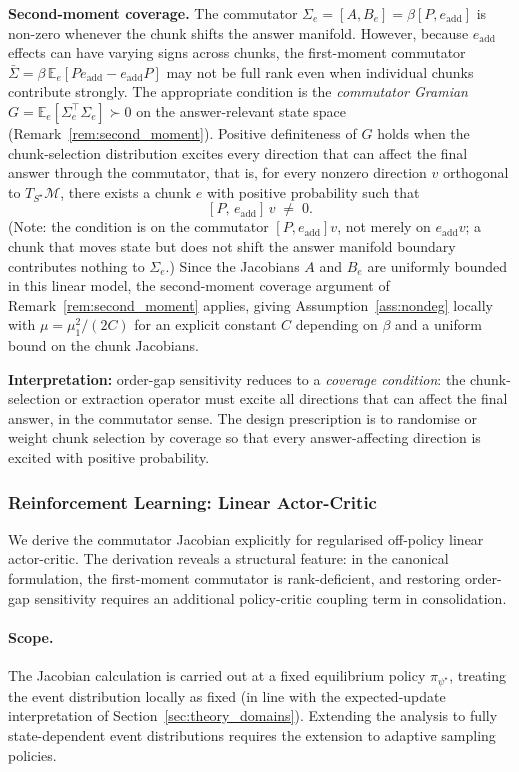 \documentclass[12pt,a4paper]{article}
\begin{document}
\textbf{Second-moment coverage.}
The commutator $\Sigma_e = [A, B_e] = \beta [P, e_{\textrm{add}}]$ is
non-zero whenever the chunk shifts the answer manifold. However, because
$e_{\textrm{add}}$ effects can have varying signs across chunks, the
first-moment commutator $\bar\Sigma = \beta\,\mathbb{E}_e[P
e_{\textrm{add}} - e_{\textrm{add}} P]$ may not be full rank even when
individual chunks contribute strongly. The appropriate condition is the
\emph{commutator Gramian} $G = \mathbb{E}_e[\Sigma_e^\top \Sigma_e] \succ 0$
on the answer-relevant state space (Remark~\ref{rem:second_moment}). Positive
definiteness of $G$ holds when the chunk-selection distribution excites every
direction that can affect the final answer through the commutator, that is,
for every nonzero direction $v$ orthogonal to $T_{S^\star}\mathcal{M}$,
there exists a chunk $e$ with positive probability such that
\[
  [P,\, e_{\textrm{add}}]\,v \;\neq\; 0.
\]
(Note: the condition is on the commutator $[P, e_{\textrm{add}}]v$, not merely
on $e_{\textrm{add}}v$; a chunk that moves state but does not shift the answer
manifold boundary contributes nothing to $\Sigma_e$.) Since the Jacobians
$A$ and $B_e$ are uniformly bounded in this linear model, the second-moment
coverage argument of Remark~\ref{rem:second_moment} applies, giving
Assumption~\ref{ass:nondeg} locally with $\mu = \mu_1^2/(2C)$ for an
explicit constant $C$ depending on $\beta$ and a uniform bound on the chunk Jacobians.

\textbf{Interpretation:} order-gap sensitivity reduces to a
\emph{coverage condition}: the chunk-selection or extraction
operator must excite all directions that can affect the final answer, in the
commutator sense.
The design prescription is to randomise or weight chunk selection by coverage
so that every answer-affecting direction is excited with positive probability.

\subsubsection*{Reinforcement Learning: Linear Actor-Critic}

We derive the commutator Jacobian explicitly for regularised off-policy linear
actor-critic. The derivation reveals a structural feature: in the canonical
formulation, the first-moment commutator is rank-deficient, and restoring
order-gap sensitivity requires an additional policy-critic coupling term in
consolidation.

\paragraph{Scope.}
The Jacobian calculation is carried out at a fixed equilibrium policy
$\pi_{\psi^\star}$, treating the event distribution locally as fixed (in line with
the expected-update interpretation of Section~\ref{sec:theory_domains}). Extending the
analysis to fully state-dependent event distributions requires the extension to
adaptive sampling policies.
\end{document}
